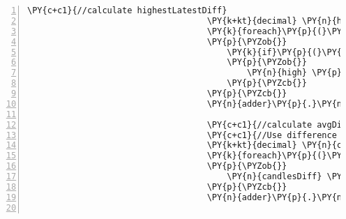 \begin{Verbatim}[commandchars=\\\{\},numbers=left,firstnumber=1,stepnumber=1,numberblanklines=0]
                                    \PY{c+c1}{//calculate highestLatestDiff}
                                    \PY{k+kt}{decimal} \PY{n}{high} \PY{p}{=} \PY{l+m}{0.00}\PY{n}{M}\PY{p}{;}
                                    \PY{k}{foreach}\PY{p}{(}\PY{n}{Candle} \PY{n}{c} \PY{k}{in} \PY{n}{candles}\PY{p}{)}
                                    \PY{p}{\PYZob{}}
                                        \PY{k}{if}\PY{p}{(}\PY{n}{c}\PY{p}{.}\PY{n}{High} \PY{p}{\PYZgt{}} \PY{n}{high}\PY{p}{)}
                                        \PY{p}{\PYZob{}}
                                            \PY{n}{high} \PY{p}{=} \PY{p}{(}\PY{k+kt}{decimal}\PY{p}{)}\PY{n}{c}\PY{p}{.}\PY{n}{High}\PY{p}{;}
                                        \PY{p}{\PYZcb{}}
                                    \PY{p}{\PYZcb{}}
                                    \PY{n}{adder}\PY{p}{.}\PY{n}{HighestLatestDiff} \PY{p}{=} \PY{p}{(}\PY{k+kt}{decimal}\PY{p}{)}\PY{n}{candles}\PY{p}{.}\PY{n}{Last}\PY{p}{(}\PY{p}{)}\PY{p}{.}\PY{n}{Close} \PY{p}{\PYZhy{}} \PY{n}{high}\PY{p}{;}

                                    \PY{c+c1}{//calculate avgDiff}
                                    \PY{c+c1}{//Use difference between open and close of candles to calculate the average diff}
                                    \PY{k+kt}{decimal} \PY{n}{candlesDiff} \PY{p}{=} \PY{l+m}{0.00}\PY{n}{M}\PY{p}{;}
                                    \PY{k}{foreach}\PY{p}{(}\PY{n}{Candle} \PY{n}{c} \PY{k}{in}  \PY{n}{candles}\PY{p}{)}
                                    \PY{p}{\PYZob{}}
                                        \PY{n}{candlesDiff} \PY{p}{+}\PY{p}{=} \PY{p}{(}\PY{k+kt}{decimal}\PY{p}{)}\PY{p}{(}\PY{n}{c}\PY{p}{.}\PY{n}{Close} \PY{p}{\PYZhy{}} \PY{n}{c}\PY{p}{.}\PY{n}{Open}\PY{p}{)}\PY{p}{;}
                                    \PY{p}{\PYZcb{}}
                                    \PY{n}{adder}\PY{p}{.}\PY{n}{avgDiff} \PY{p}{=} \PY{n}{candlesDiff} \PY{p}{/} \PY{n}{candles}\PY{p}{.}\PY{n}{Count}\PY{p}{(}\PY{p}{)}\PY{p}{;}
                                    

\end{Verbatim}
